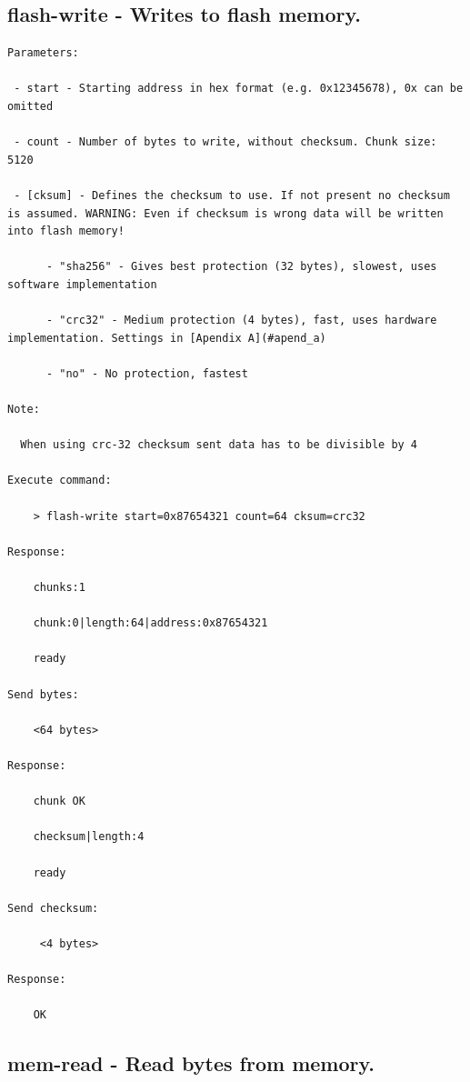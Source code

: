 \subsection{flash-write - Writes to flash memory.}
\label{bl_cmd:flash-write}

\begin{lstlisting}
Parameters:

 - start - Starting address in hex format (e.g. 0x12345678), 0x can be omitted
     
 - count - Number of bytes to write, without checksum. Chunk size: 5120
 
 - [cksum] - Defines the checksum to use. If not present no checksum is assumed. WARNING: Even if checksum is wrong data will be written into flash memory!
 
      - "sha256" - Gives best protection (32 bytes), slowest, uses software implementation
           
      - "crc32" - Medium protection (4 bytes), fast, uses hardware implementation. Settings in [Apendix A](#apend_a)

      - "no" - No protection, fastest

Note:

  When using crc-32 checksum sent data has to be divisible by 4

Execute command: 

    > flash-write start=0x87654321 count=64 cksum=crc32  
    
Response: 

    chunks:1

    chunk:0|length:64|address:0x87654321

    ready
    
Send bytes:

    <64 bytes>
    
Response:

    chunk OK

    checksum|length:4

    ready
 
Send checksum:
     
     <4 bytes>
     
Response:
 
    OK
\end{lstlisting}

\subsection{mem-read - Read bytes from memory.}
\label{bl_cmd:mem-read}

